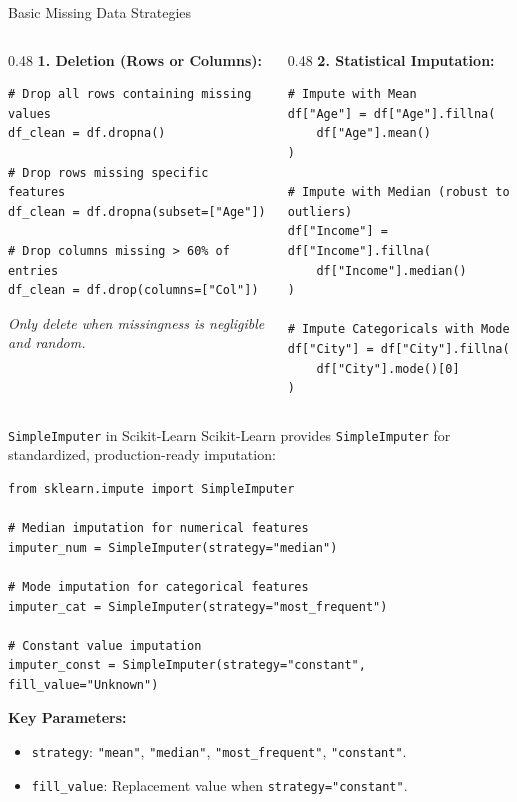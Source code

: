 \documentclass[aspectratio=169,11pt]{beamer}
\newcommand{\code}[1]{\texttt{#1}}
\newcommand{\smallgap}{\vspace{0.35em}}
\begin{document}
\begin{frame}[fragile]{Basic Missing Data Strategies}
\begin{columns}[T]
\begin{column}{0.48\textwidth}
\textbf{1. Deletion (Rows or Columns):}
\begin{lstlisting}[style=pythonstyle]
# Drop all rows containing missing values
df_clean = df.dropna()

# Drop rows missing specific features
df_clean = df.dropna(subset=["Age"])

# Drop columns missing > 60% of entries
df_clean = df.drop(columns=["Col"])
\end{lstlisting}
\textit{Only delete when missingness is negligible and random.}
\end{column}
\begin{column}{0.48\textwidth}
\textbf{2. Statistical Imputation:}
\begin{lstlisting}[style=pythonstyle]
# Impute with Mean
df["Age"] = df["Age"].fillna(
    df["Age"].mean()
)

# Impute with Median (robust to outliers)
df["Income"] = df["Income"].fillna(
    df["Income"].median()
)

# Impute Categoricals with Mode
df["City"] = df["City"].fillna(
    df["City"].mode()[0]
)
\end{lstlisting}
\end{column}
\end{columns}
\end{frame}

\begin{frame}[fragile]{\texttt{SimpleImputer} in Scikit-Learn}
Scikit-Learn provides \code{SimpleImputer} for standardized, production-ready imputation:
\begin{lstlisting}[style=pythonstyle]
from sklearn.impute import SimpleImputer

# Median imputation for numerical features
imputer_num = SimpleImputer(strategy="median")

# Mode imputation for categorical features
imputer_cat = SimpleImputer(strategy="most_frequent")

# Constant value imputation
imputer_const = SimpleImputer(strategy="constant", fill_value="Unknown")
\end{lstlisting}

\smallgap
\textbf{Key Parameters:}
\begin{itemize}
  \item \code{strategy}: \code{"mean"}, \code{"median"}, \code{"most\_frequent"}, \code{"constant"}.
  \item \code{fill\_value}: Replacement value when \code{strategy="constant"}.
\end{itemize}
\end{frame}
\end{document}
